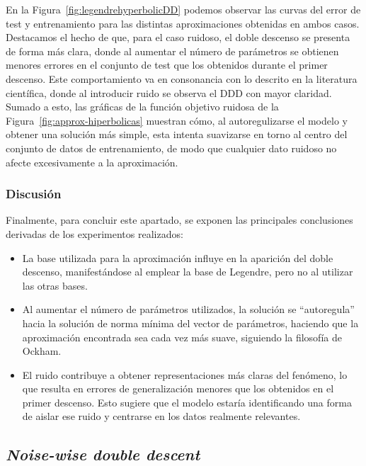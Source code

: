 En la Figura~\ref{fig:legendrehyperbolicDD} podemos observar las curvas del error de test y entrenamiento para las distintas aproximaciones obtenidas en ambos casos. Destacamos el hecho de que, para el caso ruidoso, el doble descenso se presenta de forma más clara, donde al aumentar el número de parámetros se obtienen menores errores en el conjunto de test que los obtenidos durante el primer descenso. Este comportamiento va en consonancia con lo descrito en la literatura científica, donde al introducir ruido se observa el DDD con mayor claridad. Sumado a esto, las gráficas de la función objetivo ruidosa de la Figura~\ref{fig:approx-hiperbolicas} muestran cómo, al autoregulizarse el modelo y obtener una solución más simple, esta intenta suavizarse en torno al centro del conjunto de datos de entrenamiento, de modo que cualquier dato ruidoso no afecte excesivamente a la aproximación.

\subsubsection{Discusión}\label{subsubsec:discusion-polinomico}

Finalmente, para concluir este apartado, se exponen las principales conclusiones derivadas de los experimentos realizados:

\begin{itemize}
    \item La base utilizada para la aproximación influye en la aparición del doble descenso, manifestándose al emplear la base de Legendre, pero no al utilizar las otras bases.
    \item Al aumentar el número de parámetros utilizados, la solución se ``autoregula'' hacia la solución de norma mínima del vector de parámetros, haciendo que la aproximación encontrada sea cada vez más suave, siguiendo la filosofía de Ockham.
    \item El ruido contribuye a obtener representaciones más claras del fenómeno, lo que resulta en errores de generalización menores que los obtenidos en el primer descenso. Esto sugiere que el modelo estaría identificando una forma de aislar ese ruido y centrarse en los datos realmente relevantes.
\end{itemize}

\subsection{\textit{Noise-wise double descent}}\label{subsec:noise-wise-dd}

